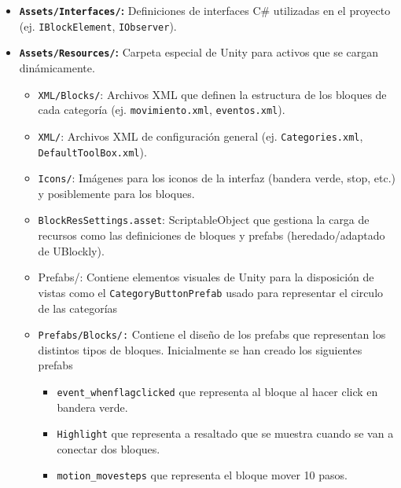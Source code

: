 \begin{itemize}
\begin{itemize}
		\item \texttt{MotionBlockInterpreter.cs:} (Originalmente lo tenías aquí, pero conceptualmente encaja mejor en \texttt{Assets/CSharp/Interpreters/}. Asegúrate de dónde está realmente).
		\item \texttt{RobotBehaviour.cs:} Script que controla el comportamiento y animación del GameObject del robot.
	\end{itemize}
	\item \textbf{\texttt{Assets/Interfaces/}:} Definiciones de interfaces C\# utilizadas en el proyecto (ej. \texttt{IBlockElement}, \texttt{IObserver}).
	\item \textbf{\texttt{Assets/Resources/}:} Carpeta especial de Unity para activos que se cargan dinámicamente.
	\begin{itemize}
		\item \texttt{XML/Blocks/}: Archivos XML que definen la estructura de los bloques de cada categoría (ej. \texttt{movimiento.xml}, \texttt{eventos.xml}).
		\item \texttt{XML/}: Archivos XML de configuración general (ej. \texttt{Categories.xml}, \texttt{DefaultToolBox.xml}).
		\item \texttt{Icons/}: Imágenes para los iconos de la interfaz (bandera verde, stop, etc.) y posiblemente para los bloques.
		\item \texttt{BlockResSettings.asset}: ScriptableObject que gestiona la carga de recursos como las definiciones de bloques y prefabs (heredado/adaptado de UBlockly).
		\item Prefabs/: Contiene elementos visuales de Unity para la disposición de vistas como el \texttt{CategoryButtonPrefab} usado para representar el circulo de las categorías
		\item \texttt{Prefabs/Blocks/:} Contiene el diseño de los prefabs que representan los distintos tipos de bloques. Inicialmente se han creado los siguientes prefabs
		\begin{itemize}
			\item \texttt{event\_whenflagclicked} que representa al bloque al hacer click en bandera verde.
			\item \texttt{Highlight} que representa a resaltado que se muestra cuando se van a conectar dos bloques.
			\item \texttt{motion\_movesteps} que representa el bloque mover 10 pasos.
			

\end{itemize}
\end{itemize}
\end{itemize}
